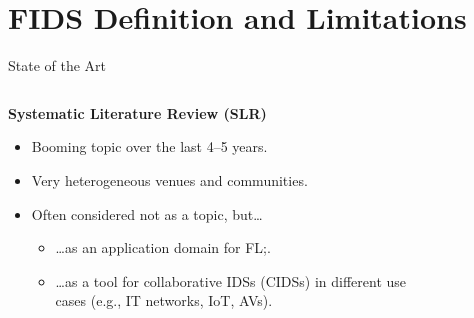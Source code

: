 

\section{FIDS Definition and Limitations}

\begin{frame}
  \sectionpage

\end{frame}


\begin{frame}{State of the Art}

  \begin{columns}
    \begin{column}{0.5\textwidth}

      \textbf{Systematic Literature Review (SLR)}~\autocite{lavaur_tnsm_2022}
      \begin{itemize}
        \item Booming topic over the last 4--5 years.
        \item<2-> Very heterogeneous venues and communities.
        \item<3-> Often considered not as a topic, but\dots
        \begin{itemize}
          \item \dots{}as an application domain for FL;.
          \item \dots{}as a tool for collaborative IDSs (CIDSs) in different use cases (e.g., IT networks, IoT, AVs).
        \end{itemize}
      \end{itemize}
      
    \end{column}

    \begin{column}{0.5\textwidth}
      \begin{figure}
        \centering
      \end{figure}
    \end{column}
      
  \end{columns}


\end{frame}

